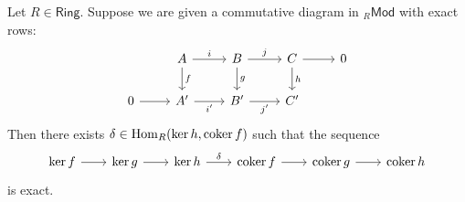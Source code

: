 \begin{proposition}
	\label{prop:snake_lemma}
	Let $R \in \mathsf{Ring}$. Suppose we are given a commutative diagram in $_{R}\mathsf{Mod}$ with exact rows:
	\begin{equation*}
		\begin{tikzcd}
			& A \arrow[r,"i"]\arrow[d,"f"] & B \arrow[r,"j"]\arrow[d,"g"] & C \arrow[r]\arrow[d,"h"] & 0\\
			0 \arrow[r] & A' \arrow[r,"i'"'] & B' \arrow[r,"j'"'] & C'
		\end{tikzcd}
	\end{equation*}
	Then there exists $\delta \in \operatorname{Hom}_R(\ker h,\operatorname{coker} f)$ such that the sequence
	\begin{equation}
		\begin{tikzcd}[column sep = 2em]
			 \ker f \arrow[r] & \ker g \arrow[r] & \ker h \arrow[r,"\delta"] & \coker f \arrow[r] & \coker g \arrow[r] & \coker h
		 \end{tikzcd}
	\end{equation}
	\noindent is exact.
\end{proposition}

